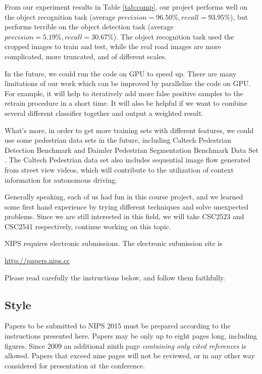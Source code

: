 \documentclass{article} %
\begin{document}
From our experiment results in Table \ref{tab:comp}, our project performs well on the object recognition task (average $precision=96.50\%, recall=93.95\%$), but performs terrible on the object detection task (average $precision=5.19\%, recall=30.67\%$). The object recognition task used the cropped images to train and test, while the real road images are more complicated, more truncated, and of different scales.

In the future, we could run the code on GPU to speed up. There are many limitations of our work which can be improved by parallelize the code on GPU. For example, it will help to iteratively add more false positive samples to the retrain procedure in a short time. It will also be helpful if we want to combine several different classifier together and output a weighted result.

What's more, in order to get more training sets with different features, we could use some pedestrian data sets in the future, including Caltech Pedestrian Detection Benchmark \cite{Dollar2009} and Daimler Pedestrian Segmentation Benchmark Data Set \cite{flohr2013pedcut}. The Caltech Pedestrian data set also includes sequential image flow generated from street view videos, which will contribute to the utilization of context information for autonomous driving. 

Generally speaking, each of us had fun in this course project, and we learned some first hand experience by trying different techniques and solve unexpected problems. Since we are still interested in this field, we will take CSC2523 and CSC2541 respectively, continue working on this topic.


\iffalse 


NIPS requires electronic submissions.  The electronic submission site is  
\begin{center}
   \url{http://papers.nips.cc}
\end{center}

Please read carefully the
instructions below, and follow them faithfully.
\subsection{Style}

Papers to be submitted to NIPS 2015 must be prepared according to the
instructions presented here. Papers may be only up to eight pages long,
including figures. Since 2009 an additional ninth page \textit{containing only
cited references} is allowed. Papers that exceed nine pages will not be
reviewed, or in any other way considered for presentation at the conference.
\end{document}
